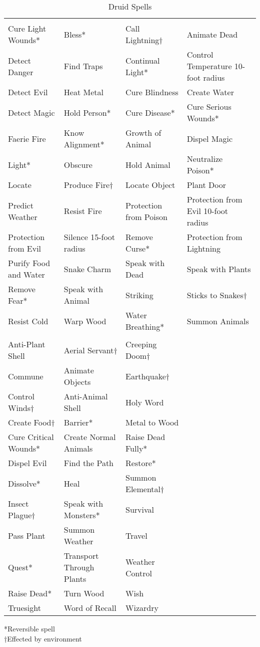 \begin {table}[H]
  \caption{Druid Spells}
  \begin{tabularx}{\columnwidth}{YYYY}
	 &  &  & \\
	Cure Light Wounds* & Bless* & Call Lightning† & Animate Dead\\
	Detect Danger & Find Traps & Continual Light* & Control Temperature 10-foot radius\\
	Detect Evil & Heat Metal & Cure Blindness & Create Water\\
	Detect Magic & Hold Person* & Cure Disease* & Cure Serious Wounds*\\
	Faerie Fire & Know Alignment* & Growth of Animal & Dispel Magic\\
	Light* & Obscure & Hold Animal & Neutralize Poison*\\
	Locate & Produce Fire† & Locate Object & Plant Door\\
	Predict Weather & Resist Fire & Protection from Poison & Protection from Evil 10-foot radius\\
	Protection from Evil & Silence 15-foot radius & Remove Curse* & Protection from Lightning\\
	Purify Food and Water & Snake Charm & Speak with Dead & Speak with Plants\\
	Remove Fear* & Speak with Animal & Striking & Sticks to Snakes†\\
	Resist Cold & Warp Wood & Water Breathing* & Summon Animals\\
	 &  & \\
	Anti-Plant Shell & Aerial Servant† & Creeping Doom†\\
	Commune & Animate Objects & Earthquake†\\
	Control Winds† & Anti-Animal Shell & Holy Word\\
	Create Food† & Barrier* & Metal to Wood\\
	Cure Critical Wounds* & Create Normal Animals & Raise Dead Fully*\\
	Dispel Evil & Find the Path & Restore*\\
	Dissolve* & Heal & Summon Elemental†\\
	Insect Plague† & Speak with Monsters* & Survival\\
	Pass Plant & Summon Weather & Travel\\
	Quest* & Transport Through Plants & Weather Control\\
	Raise Dead* & Turn Wood & Wish\\
	Truesight & Word of Recall & Wizardry\
  \end {tabularx}
	*Reversible spell\\
	†Effected by environment
\end {table}

